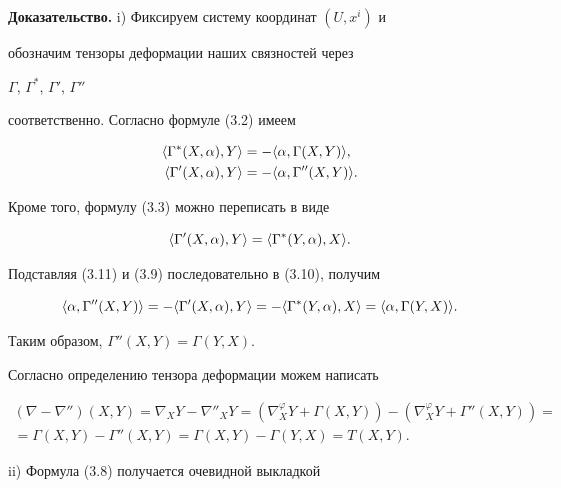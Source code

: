  


{\bf Доказательство.} i) Фиксируем систему координат $(U,x^i)$ и 


обозначим тензоры деформации наших связностей через 


$\Gamma$, $\Gamma^*$, $\Gamma'$, $\Gamma''$ 


соответственно. Согласно формуле (3.2) имеем 


\begin{align} 


\la\Gamma^*(X,\alpha),Y\ra&=-\la\alpha,\Gamma(X,Y)\ra, \\ 


\la\Gamma'(X,\alpha),Y\ra&=-\la\alpha,\Gamma''(X,Y)\ra. 


\end{align} 


Кроме того, формулу (3.3) можно переписать в виде


\begin{equation} 


\la\Gamma'(X,\alpha),Y\ra=\la\Gamma^*(Y,\alpha),X\ra. 


\end{equation} 


Подставляя (3.11) и (3.9) последовательно в (3.10), получим 


$$ 


\la\alpha,\Gamma''(X,Y)\ra=-\la\Gamma'(X,\alpha),Y\ra= 


-\la\Gamma^*(Y,\alpha),X\ra= 


\la\alpha,\Gamma(Y,X)\ra. 


$$ 


Таким образом, $\Gamma''(X,Y)=\Gamma(Y,X)$. 


Согласно определению тензора деформации можем написать 


\begin{multline*} 


(\nabla-\nabla'')(X,Y)=\nabla_X Y-\nabla''_X Y= 


(\nabla^\varphi_X Y+\Gamma(X,Y))- 


(\nabla^\varphi_X Y+\Gamma''(X,Y))= \\ 


=\Gamma(X,Y)-\Gamma''(X,Y)=\Gamma(X,Y)- 


\Gamma(Y,X)=T(X,Y). 


\end{multline*} 


 


ii) Формула (3.8) получается очевидной выкладкой 


